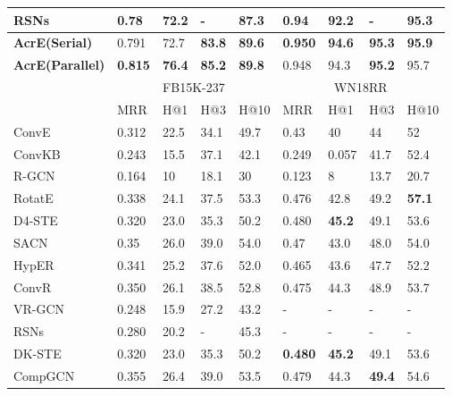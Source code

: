 \documentclass[11pt]{article}
\begin{document}
\begin{table}[thbp]
{\begin{tabular}{lllllllll}
			RSNs\footnotesize{\cite{Guo:2019}} & 0.78 & 72.2 & - &87.3  &0.94 &92.2 &- &95.3      \\
			\midrule
			{\bf AcrE(Serial)} & {0.791} & {72.7} & {\bf 83.8} &{\bf 89.6}   & {\bf 0.950} &{\bf 94.6} &{\bf 95.3} &{\bf 95.9}     \\
			{\bf AcrE(Parallel)} & {\bf 0.815} & {\bf 76.4} & {\bf 85.2} &{\bf 89.8}   & {0.948} &{94.3} &{\bf 95.2} &{95.7}     \\
			\midrule
			\multicolumn{1}{r}{} & \multicolumn{4}{c}{FB15K-237}  & \multicolumn{4}{c}{WN18RR} \\
			\cmidrule{2-9}     
			\multicolumn{1}{r}{} &  \multicolumn{1}{l}{MRR} & \multicolumn{1}{l}{H@1} & \multicolumn{1}{l}{H@3} & \multicolumn{1}{l}{H@10} & \multicolumn{1}{l}{MRR} & \multicolumn{1}{l}{H@1} & \multicolumn{1}{l}{H@3} & \multicolumn{1}{l}{H@10} \\
			
			\midrule
			
			ConvE\footnotesize{\cite{Dettmers:2018}}     & 0.312  & 22.5  & 34.1  & 49.7    & 0.43 & 40  & 44    & 52  \\
			ConvKB\footnotesize{\cite{Nguyen:2018}}    & 0.243  & 15.5  & 37.1  & 42.1    & 0.249 & 0.057  & 41.7    & 52.4   \\
			R-GCN\footnotesize{\cite{Schlichtkrull:2018}}    & 0.164  & 10  & 18.1  & 30     & 0.123 & 8  & 13.7    & 20.7  \\
RotatE\footnotesize{\cite{Sun:2019}}     & 0.338  & 24.1  & 37.5  & 53.3   & 0.476 & 42.8  & {49.2}   & {\bf 57.1} \\
			D4-STE\footnotesize{\cite{Xu:2019}}   & 0.320  & 23.0  & 35.3  & 50.2    & {0.480} & {\bf 45.2}  & 49.1   & 53.6  \\
			
			SACN\footnotesize{\cite{Shang:2019}}     & 0.35  & 26.0  &{39.0}  &{54.0}     & 0.47 & 43.0  & 48.0   & 54.0  \\
			HypER\footnotesize{\cite{Balazevic:2019b}}    & 0.341  & 25.2  & 37.6  & 52.0   & 0.465 & 43.6  & 47.7   & 52.2  \\
			ConvR\footnotesize{\cite{Jiang:2019}}    & 0.350  & 26.1  & {38.5}  & 52.8    & 0.475 & {44.3} & 48.9   & 53.7  \\
			VR-GCN\footnotesize{\cite{Ye:2019}}   & 0.248  & 15.9  & 27.2  & 43.2   & - & -  & -   & -  \\
			RSNs\footnotesize{~\cite{Guo:2019}} & 0.280  & 20.2  & -  & 45.3   & - & -  & -   & -  \\
			DK-STE\footnotesize{~\cite{Xu:2019}}  & 0.320  & 23.0  & {35.3}  & 50.2   & {\bf 0.480} & {\bf 45.2}  & {49.1}   & {53.6}  \\
CompGCN\footnotesize{\cite{Vashishth:2020b}}  & 0.355  & 26.4  & {39.0}  & 53.5   & 0.479 & {44.3}  & {\bf 49.4}   & {54.6}  \\
			

\end{tabular}}
\end{table}
\end{document}
